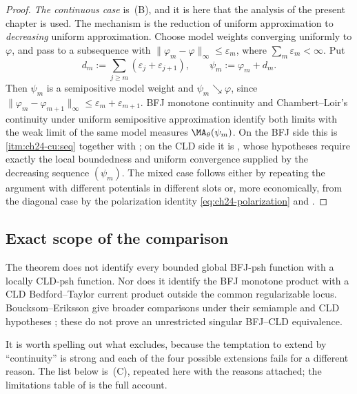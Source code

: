 \begin{proof}
\emph{The continuous case} is
\,(B), and it is here that the analysis of
the present chapter is used.  The mechanism is the reduction of uniform
approximation to \emph{decreasing} uniform approximation.  Choose model
weights converging uniformly to \(\varphi\), and pass to a subsequence with
\(\|\varphi_m-\varphi\|_\infty\leq\varepsilon_m\), where
\(\sum_m\varepsilon_m<\infty\). Put
\[
 d_m:=\sum_{j\geq m}(\varepsilon_j+\varepsilon_{j+1}),
 \qquad \psi_m:=\varphi_m+d_m.
\]
Then \(\psi_m\) is a semipositive model weight and
\(\psi_m\searrow\varphi\), since
\(\|\varphi_m-\varphi_{m+1}\|_\infty
 \leq\varepsilon_m+\varepsilon_{m+1}\).
BFJ monotone continuity and Chambert--Loir's continuity under uniform
semipositive approximation identify both limits with the weak limit of the
same model measures \(\MA_\theta(\psi_m)\).  On the BFJ side this is
\,\cref{itm:ch24-cu:seq} together with
; on the CLD side it is
, whose hypotheses require exactly the local
boundedness and uniform convergence supplied by the decreasing sequence
\((\psi_m)\).  The mixed case follows either by repeating the argument with
different potentials in different slots or, more economically, from the
diagonal case by the polarization identity
\eqref{eq:ch24-polarization} and .
\end{proof}

\subsection{Exact scope of the comparison}
\label{sec:ch24-scope-comparison}

\begin{remark}
\label{rem:ch24-comparison-boundary}
The theorem does not identify every bounded global BFJ-psh function with a
locally CLD-psh function. Nor does it identify the BFJ monotone product with
a CLD Bedford--Taylor current product outside the common regularizable
locus. Boucksom--Eriksson give broader comparisons under their semiample and
CLD hypotheses \cite[Theorems~7.14 and~8.4]{BE21}; these do not prove an
unrestricted singular BFJ--CLD equivalence.
\end{remark}

It is worth spelling out what  excludes,
because the temptation to extend  by
``continuity'' is strong and each of the four possible extensions fails for a
different reason.  The list below is
\,(C), repeated here with the reasons
attached; the limitations table of  is the full
account.

